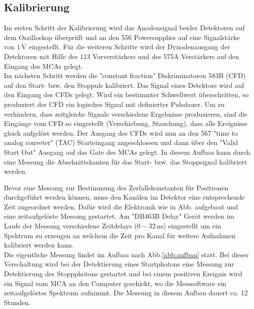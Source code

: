 \documentclass[numbers=noenddot,12pt,a4paper]{scrartcl}
\begin{document}
	\subsection{Kalibrierung}
		
		Im ersten Schritt der Kalibrierung wird das Anodensignal beider Detektoren auf dem Oszilloskop überprüft und an den 556 Powersupplies auf eine Signalstärke von $1\,\mathrm{V}$ eingestellt. Für die weiteren Schritte wird der Dynodenausgang der Detektoren mit Hilfe des 113 Vorverstärkers und des 575A Verstärkers auf den Eingang des MCAs gelegt.\\
		Im nächsten Schritt werden die "constant fraction" Diskriminatoren 583B (CFD) auf den Start- bzw. den Stoppuls kalibriert. Das Signal eines Detektors wird auf den Eingang des CFDs gelegt. Wird ein bestimmter Schwellwert überschritten, so produziert der CFD ein logisches Signal mit definierter Pulsdauer. Um zu verhindern, dass zeitgleiche Signale verschiedene Ergebnisse produzieren, sind die Eingänge vom CFD so eingestellt (Verschiebung, Stauchung), dass alle Ereignisse gleich aufgelöst werden. Der Ausgang des CFDs wird nun an den 567 {}"time to analog conveter{}" (TAC) Starteingang angeschlossen und dann über den {}"Valid Start Out{}" Ausgang auf das Gate des MCAs gelegt. In diesem Aufbau kann durch eine Messung die Abschnittskanten für das Start- bzw. das Stoppsignal kalibriert werden.
		
		Bevor eine Messung zur Bestimmung des Zerfallskonstanten für Positronen durchgeführt werden können, muss den Kanälen im Detektor eine entsprechende Zeit zugeordnet werden. Dafür wird die Elektronik wie in Abb. aufgebaut und eine zeitaufgelöste Messung gestartet. Am {}"DB463B Delay{}" Gerät werden im Laufe der Messung verschiedene Zeitdelays ($0 - 32\,\mathrm{ns}$) eingestellt um ein Spektrum zu erzeugen an welchem die Zeit pro Kanal für weitere Aufnahmen kalibriert werden kann.
		\\
		Die eigentliche Messung findet im Aufbau nach Abb.\ref{abb:aufbau} statt. Bei dieser Verschaltung wird bei der Detektierung eines Startphotons eine Messung zur Detektierung des Stoppphotons gestartet und bei einem positiven Ereignis wird ein Signal vom MCA an den Computer geschickt, wo die Messsoftware ein zeitaufgelöstes Spektrum aufnimmt. Die Messung in diesem Aufbau dauert ca. 12 Stunden.
	    
\end{document}

